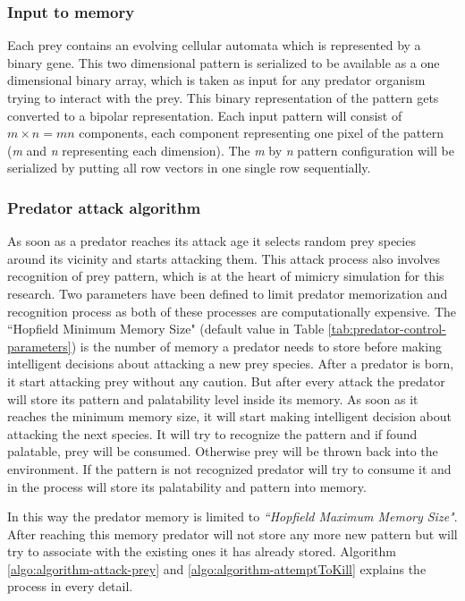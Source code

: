 \subsubsection{Input to memory}
Each prey contains an evolving cellular automata which is represented by a binary gene. This two dimensional pattern is serialized to be available as a one dimensional binary array, which is taken as input for any predator organism trying to interact with the prey. This binary representation of the pattern gets converted to a bipolar representation. Each input pattern will consist of \(\textit{m} \times \textit{n} = \textit{mn}\) components, each component representing one pixel of the pattern (\textit{m} and \textit{n} representing each dimension). The \textit{m} by \textit{n} pattern configuration will be serialized by putting all row vectors in one single row sequentially.

\subsubsection{Predator attack algorithm}
As soon as a predator reaches its attack age it selects random prey species around its vicinity and starts attacking them. This attack process also involves recognition of prey pattern, which is at the heart of mimicry simulation for this research. Two parameters have been defined to limit predator memorization and recognition process as both of these processes are computationally expensive. The ``Hopfield Minimum Memory Size" (default value in Table \ref{tab:predator-control-parameters}) is the number of memory a predator needs to store before making intelligent decisions about attacking a new prey species. After a predator is born, it start attacking prey without any caution. But after every attack the predator will store its pattern and palatability level inside its memory. As soon as it reaches the minimum memory size, it will start making intelligent decision about attacking the next species. It will try to recognize the pattern and if found palatable, prey will be consumed. Otherwise prey will be thrown back into the environment. If the pattern is not recognized predator will try to consume it and in the process will store its palatability and pattern into memory. 

In this way the predator memory is limited to \textsl{``Hopfield Maximum Memory Size"}. After reaching this memory predator will not store any more new pattern but will try to associate with the existing ones it has already stored. Algorithm \ref{algo:algorithm-attack-prey} and \ref{algo:algorithm-attemptToKill} explains the process in every detail.

